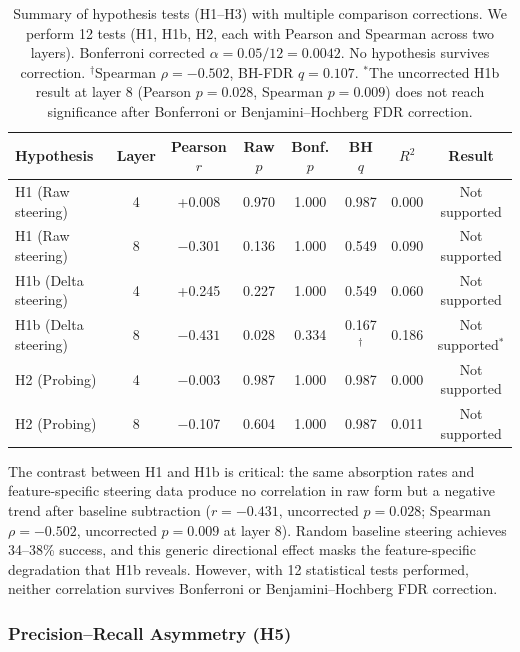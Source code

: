 \documentclass{article}
\begin{document}
\begin{table}[t]
\caption{Summary of hypothesis tests (H1--H3) with multiple comparison corrections. We perform 12 tests (H1, H1b, H2, each with Pearson and Spearman across two layers). Bonferroni corrected $\alpha = 0.05 / 12 = 0.0042$. No hypothesis survives correction. $^\dagger$Spearman $\rho = -0.502$, BH-FDR $q = 0.107$. $^*$The uncorrected H1b result at layer 8 (Pearson $p = 0.028$, Spearman $p = 0.009$) does not reach significance after Bonferroni or Benjamini--Hochberg FDR correction.}
\label{tab:hypothesis-tests}
\centering
\small
\setlength{\tabcolsep}{4pt}
\begin{tabular}{@{}lccccccc@{}}
\toprule
Hypothesis & Layer & Pearson $r$ & Raw $p$ & Bonf. $p$ & BH $q$ & $R^2$ & Result \\
\midrule
H1 (Raw steering) & 4 & +0.008 & 0.970 & 1.000 & 0.987 & 0.000 & Not supported \\
H1 (Raw steering) & 8 & $-$0.301 & 0.136 & 1.000 & 0.549 & 0.090 & Not supported \\
H1b (Delta steering) & 4 & +0.245 & 0.227 & 1.000 & 0.549 & 0.060 & Not supported \\
H1b (Delta steering) & 8 & $\mathbf{-0.431}$ & $\mathbf{0.028}$ & 0.334 & 0.167$^\dagger$ & 0.186 & Not supported$^*$ \\
H2 (Probing) & 4 & $-$0.003 & 0.987 & 1.000 & 0.987 & 0.000 & Not supported \\
H2 (Probing) & 8 & $-$0.107 & 0.604 & 1.000 & 0.987 & 0.011 & Not supported \\
\bottomrule
\end{tabular}
\end{table}

The contrast between H1 and H1b is critical: the same absorption rates and feature-specific steering data produce no correlation in raw form but a negative trend after baseline subtraction ($r = -0.431$, uncorrected $p = 0.028$; Spearman $\rho = -0.502$, uncorrected $p = 0.009$ at layer 8). Random baseline steering achieves 34--38\% success, and this generic directional effect masks the feature-specific degradation that H1b reveals. However, with 12 statistical tests performed, neither correlation survives Bonferroni or Benjamini--Hochberg FDR correction.

\subsubsection{Precision--Recall Asymmetry (H5)}
\end{document}
